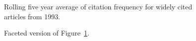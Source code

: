 \documentclass[
  10pt,
  letterpaper,
  DIV=11,
  numbers=noendperiod,
  twoside]{scrartcl}
\begin{document}
\begin{figure}


\caption{\label{fig-citation-spaghetti-1993}Rolling five year average of
citation frequency for widely cited articles from 1993.}

\end{figure}%

\begin{figure}


\caption{\label{fig-citation-facet-1993}Faceted version of
Figure~\ref{fig-citation-spaghetti-1993}.}

\end{figure}%
\end{document}
